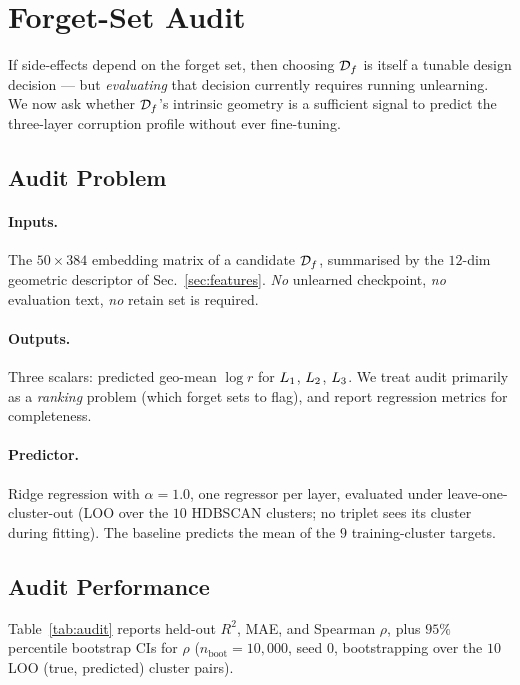\section{Forget-Set Audit}
\label{sec:audit}

If side-effects depend on the forget set, then choosing $\mathcal{D}_f$ is itself a tunable design decision --- but \emph{evaluating} that decision currently requires running unlearning. We now ask whether $\mathcal{D}_f$'s intrinsic geometry is a sufficient signal to predict the three-layer corruption profile without ever fine-tuning.

\subsection{Audit Problem}
\label{sec:audit-problem}

\paragraph{Inputs.} The $50\!\times\!384$ embedding matrix of a candidate $\mathcal{D}_f$, summarised by the $12$-dim geometric descriptor of Sec.~\ref{sec:features}. \emph{No} unlearned checkpoint, \emph{no} evaluation text, \emph{no} retain set is required.

\paragraph{Outputs.} Three scalars: predicted geo-mean $\log r$ for $L_1$, $L_2$, $L_3$. We treat audit primarily as a \emph{ranking} problem (which forget sets to flag), and report regression metrics for completeness.

\paragraph{Predictor.} Ridge regression with $\alpha{=}1.0$, one regressor per layer, evaluated under leave-one-cluster-out (LOO over the $10$ HDBSCAN clusters; no triplet sees its cluster during fitting). The baseline predicts the mean of the $9$ training-cluster targets.

\subsection{Audit Performance}
\label{sec:audit-perf}

Table~\ref{tab:audit} reports held-out $R^2$, MAE, and Spearman $\rho$, plus $95\%$ percentile bootstrap CIs for $\rho$ ($n_{\text{boot}}{=}10{,}000$, seed $0$, bootstrapping over the $10$ LOO (true, predicted) cluster pairs).

